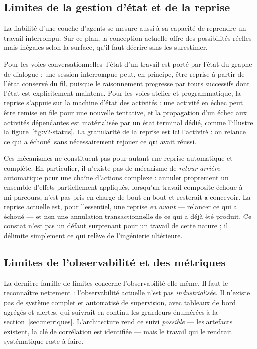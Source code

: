 \subsection{Limites de la gestion d'état et de la reprise}
\label{sec:limites-etat}

La fiabilité d'une couche d'agents se mesure aussi à sa capacité de
reprendre un travail interrompu. Sur ce plan, la conception actuelle
offre des possibilités réelles mais inégales selon la surface, qu'il
faut décrire sans les surestimer.

Pour les voies conversationnelles, l'état d'un travail est porté par
l'état du graphe de dialogue : une session interrompue peut, en
principe, être reprise à partir de l'état conservé du fil, puisque le
raisonnement progresse par tours successifs dont l'état est
explicitement maintenu. Pour les voies atelier et programmatique, la
reprise s'appuie sur la machine d'état des activités : une activité en
échec peut être remise en file pour une nouvelle tentative, et la
propagation d'un échec aux activités dépendantes est matérialisée par
un état terminal dédié, comme l'illustre la figure~\ref{fig:v2-status}.
La granularité de la reprise est ici l'activité : on relance ce qui a
échoué, sans nécessairement rejouer ce qui avait réussi.

Ces mécanismes ne constituent pas pour autant une reprise
automatique et complète. En particulier, il n'existe pas de mécanisme
de \emph{retour arrière} automatique pour une chaîne d'actions
complexe : annuler proprement un ensemble d'effets partiellement
appliqués, lorsqu'un travail composite échoue à mi-parcours, n'est pas
pris en charge de bout en bout et resterait à concevoir. La reprise
actuelle est, pour l'essentiel, une reprise \emph{en avant} — relancer
ce qui a échoué — et non une annulation transactionnelle de ce qui a
déjà été produit. Ce constat n'est pas un défaut surprenant pour un
travail de cette nature ; il délimite simplement ce qui relève de
l'ingénierie ultérieure.

\subsection{Limites de l'observabilité et des métriques}
\label{sec:limites-observabilite}

La dernière famille de limites concerne l'observabilité elle-même. Il
faut le reconnaître nettement : l'observabilité actuelle n'est pas
\emph{industrialisée}. Il n'existe pas de système complet et automatisé
de supervision, avec tableaux de bord agrégés et alertes, qui
suivrait en continu les grandeurs énumérées à la
section~\ref{sec:metriques}. L'architecture rend ce suivi
\emph{possible} — les artefacts existent, la clé de corrélation est
identifiée — mais le travail qui le rendrait systématique reste à
faire.


